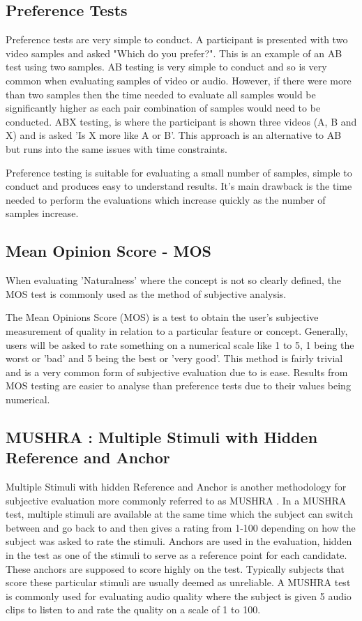 \documentclass[bsc,frontabs,twoside,singlespacing,parskip]{infthesis}
\begin{document}
\subsection{Preference Tests}

Preference tests are very simple to conduct. A participant is presented with two video samples and asked "Which do you prefer?". This is an example of an AB test using two samples. AB testing is very simple to conduct and so is very common when evaluating samples of video or audio. However, if there were more than two samples then the time needed to evaluate all samples would be significantly higher as each pair combination of samples would need to be conducted. ABX testing, \cite{abx_testing} is where the participant is shown three videos (A, B and X) and is asked 'Is X more like A or B'. This approach is an alternative to AB but runs into the same issues with time constraints.

Preference testing is suitable for evaluating a small number of samples, simple to conduct and produces easy to understand results. It's main drawback is the time needed to perform the evaluations which increase quickly as the number of samples increase.

\subsection{Mean Opinion Score - MOS}

When evaluating 'Naturalness' where the concept is not so clearly defined, the MOS test is commonly used as the method of subjective analysis. \cite{mos}

The Mean Opinions Score (MOS) is a test to obtain the user's subjective measurement of quality in relation to a particular feature or concept. Generally, users will be asked to rate something on a numerical scale like 1 to 5, 1 being the worst or 'bad' and 5 being the best or 'very good'. This method is fairly trivial and is a very common form of subjective evaluation due to is ease. Results from MOS testing are easier to analyse than preference tests due to their values being numerical.

\subsection{MUSHRA : Multiple Stimuli with Hidden Reference and Anchor}

Multiple Stimuli with hidden Reference and Anchor is another methodology for subjective evaluation more commonly referred to as MUSHRA \cite{mushra}. In a MUSHRA test, multiple stimuli are available at the same time which the subject can switch between and go back to and then gives a rating from 1-100 depending on how the subject was asked to rate the stimuli. Anchors are used in the evaluation, hidden in the test as one of the stimuli to serve as a reference point for each candidate. These anchors are supposed to score highly on the test. Typically subjects that score these particular stimuli are usually deemed as unreliable. A MUSHRA test is commonly used for evaluating audio quality \cite{mushra_bbc} where the subject is given 5 audio clips to listen to and rate the quality on a scale of 1 to 100.
\end{document}

